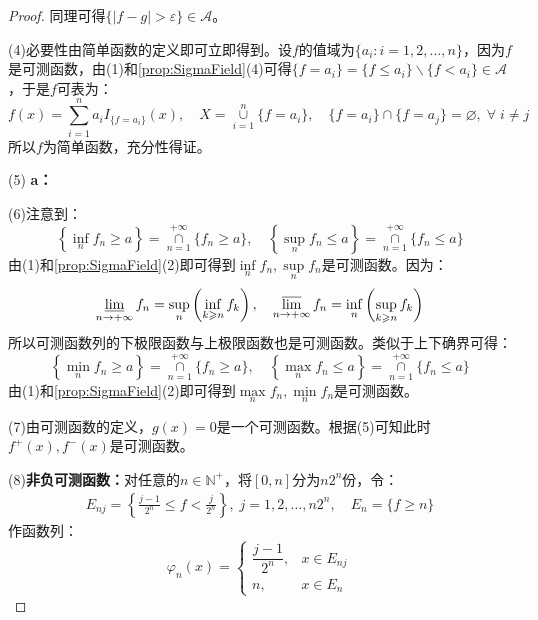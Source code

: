 \begin{proof}
	同理可得$\{|f-g|>\varepsilon\}\in\mathscr{A}$。\par
	(4)必要性由简单函数的定义即可立即得到。设$f$的值域为$\{a_i:i=1,2,\dots,n\}$，因为$f$是可测函数，由(1)和\cref{prop:SigmaField}(4)可得$\{f=a_i\}=\{f\leqslant a_i\}\backslash\{f<a_i\}\in\mathscr{A}$，于是$f$可表为：
	\begin{equation*}
		f(x)=\sum_{i=1}^{n}a_iI_{\{f=a_i\}}(x),\quad X=\underset{i=1}{\overset{n}{\cup}}\{f=a_i\},\quad\{f=a_i\}\cap\{f=a_j\}=\varnothing,\;\forall\;i\ne j
	\end{equation*}
	所以$f$为简单函数，充分性得证。\par
	(5)\textbf{ a：}\par
	(6)注意到：
	\begin{equation*}
		\left\{\inf_nf_n\geqslant a\right\}=\underset{n=1}{\overset{+\infty}{\cap}}\{f_n\geqslant a\},\quad\left\{\sup_nf_n\leqslant a\right\}=\underset{n=1}{\overset{+\infty}{\cap}}\{f_n\leqslant a\}
	\end{equation*}
	由(1)和\cref{prop:SigmaField}(2)即可得到$\inf\limits_nf_n,\sup\limits_nf_n$是可测函数。因为：
	\begin{equation*}
		\varliminf_{n\to+\infty}f_n=\sup_{n}\left(\inf_{k\geqslant n}f_k\right),\quad\varlimsup_{n\to+\infty}f_n=\inf_{n}\left(\sup_{k\geqslant n}f_k\right)
	\end{equation*}
	所以可测函数列的下极限函数与上极限函数也是可测函数。类似于上下确界可得：
	\begin{equation*}
		\left\{\min_nf_n\geqslant a\right\}=\underset{n=1}{\overset{+\infty}{\cap}}\{f_n\geqslant a\},\quad\left\{\max_nf_n\leqslant a\right\}=\underset{n=1}{\overset{+\infty}{\cap}}\{f_n\leqslant a\}
	\end{equation*}
	由(1)和\cref{prop:SigmaField}(2)即可得到$\max\limits_nf_n,\min\limits_nf_n$是可测函数。\par
	(7)由可测函数的定义，$g(x)=0$是一个可测函数。根据(5)可知此时$f^+(x),f^-(x)$是可测函数。\par
	(8)\textbf{非负可测函数：}对任意的$n\in\mathbb{N}^+$，将$[0,n]$分为$n2^n$份，令：
	\begin{gather*}
		E_{nj}=\left\{\frac{j-1}{2^n}\leqslant f<\frac{j}{2^n}\right\},\;j=1,2,\dots,n2^n ,\quad E_n=\{f\geqslant n\}
	\end{gather*}
	作函数列：
	\begin{equation*}
		\varphi_n(x)=
		\begin{cases}
			\dfrac{j-1}{2^n},&x\in E_{nj} \\
			n,&x\in E_n
		\end{cases}

\end{equation*}
\end{proof}
